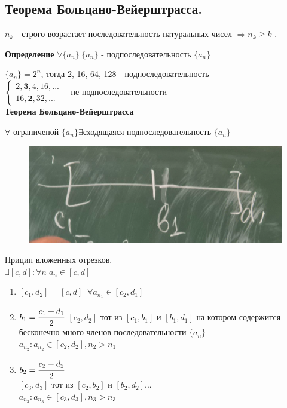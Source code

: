 \documentclass[12pt, a4paper]{article}
\begin{document}
\begin{centering}
\subsection{Теорема Больцано-Вейерштрасса.}

$n_k$ - строго возрастает последовательность натуральных чисел $\Rightarrow n_k\geq k$ .

\begin{tcolorbox}
    \textbf{Определение} $\forall \{a_n\} \; \{a_n\}$ - подпоследовательность $\{a_n\}$
\end{tcolorbox}
$\{a_n\} = 2^n$, тогда 2, 16, 64, 128 - подпоследовательность\\
$\begin{cases}
    2, \textbf{3}, 4, 16, ...\\
    16, \textbf{2}, 32, ...     
\end{cases}$ - не подпоследовательности\\

\textbf{Теорема Больцано-Вейерштрасса}
\begin{tcolorbox}[]
    $ \forall $ ограниченой $\{a_n\} \exists $сходящаяся подпоследовательность $ \{a_n\} $
\end{tcolorbox}

\begin{figure}[h]
    \centering
    \includegraphics[width=0.5\linewidth]{Т Б-В.png}
\end{figure}

\begin{tcolorbox}[title=Доказательство]
    Прицип вложенных отрезков.\\
    $\exists [c,d]: \forall n\; a_n\in[c,d]$
    \begin{enumerate}
        \item $[c_1,d_2] = [c,d] \;\; \forall a_{n_1} \in [c_2,d_1]$
        \item $b_1 = \cfrac{c_1+d_1}{2}$
                $[c_2,d_2]$ тот из $[c_1,b_1]$ и $[b_1,d_1]$ на котором содержится бесконечно много членов последовательности $\{a_n\}$\\
        $a_{n_2}: a_{n_2} \in [c_2,d_2], n_2>n_1$
        \item $b_2 = \cfrac{c_2+d_2}{2}$\\
        $[c_3,d_3]$ тот из $[c_2,b_2]$ и $[b_2,d_2] ...$\\
        $a_{n_3}: a_{n_3} \in [c_3,d_3], n_3>n_3$


\end{enumerate}
\end{tcolorbox}
\end{centering}
\end{document}
